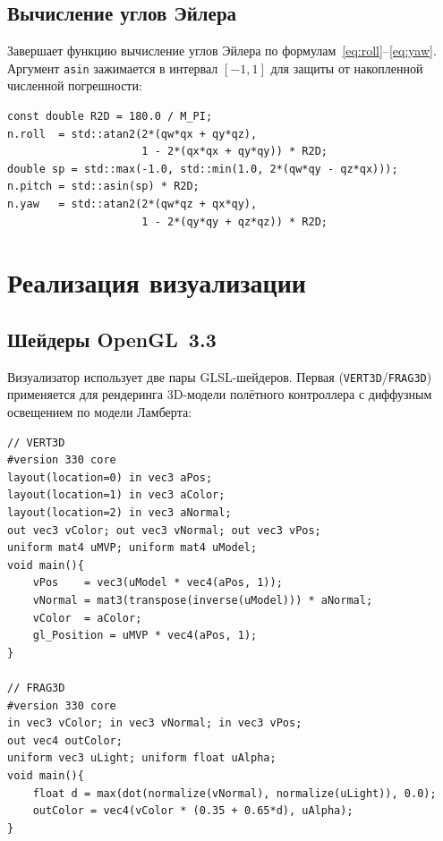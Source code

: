 \subsection{Вычисление углов Эйлера}
 
Завершает функцию вычисление углов Эйлера по
формулам~\eqref{eq:roll}--\eqref{eq:yaw}. Аргумент \texttt{asin}
зажимается в интервал $[-1,1]$ для защиты от накопленной численной
погрешности:
 
\begin{lstlisting}[caption={Углы Эйлера из кватерниона (ZYX)}]
const double R2D = 180.0 / M_PI;
n.roll  = std::atan2(2*(qw*qx + qy*qz),
                     1 - 2*(qx*qx + qy*qy)) * R2D;
double sp = std::max(-1.0, std::min(1.0, 2*(qw*qy - qz*qx)));
n.pitch = std::asin(sp) * R2D;
n.yaw   = std::atan2(2*(qw*qz + qx*qy),
                     1 - 2*(qy*qy + qz*qz)) * R2D;
\end{lstlisting}
 
\newpage
 
\section{Реализация визуализации}
 
\subsection{Шейдеры OpenGL~3.3}
 
Визуализатор использует две пары GLSL-шейдеров. Первая
(\texttt{VERT3D}/\texttt{FRAG3D}) применяется для рендеринга 3D-модели
полётного контроллера с диффузным освещением по модели Ламберта:
 
\begin{lstlisting}[language={},caption={Вершинный и фрагментный шейдеры 3D-модели}]
// VERT3D
#version 330 core
layout(location=0) in vec3 aPos;
layout(location=1) in vec3 aColor;
layout(location=2) in vec3 aNormal;
out vec3 vColor; out vec3 vNormal; out vec3 vPos;
uniform mat4 uMVP; uniform mat4 uModel;
void main(){
    vPos    = vec3(uModel * vec4(aPos, 1));
    vNormal = mat3(transpose(inverse(uModel))) * aNormal;
    vColor  = aColor;
    gl_Position = uMVP * vec4(aPos, 1);
}
 
// FRAG3D
#version 330 core
in vec3 vColor; in vec3 vNormal; in vec3 vPos;
out vec4 outColor;
uniform vec3 uLight; uniform float uAlpha;
void main(){
    float d = max(dot(normalize(vNormal), normalize(uLight)), 0.0);
    outColor = vec4(vColor * (0.35 + 0.65*d), uAlpha);
}
\end{lstlisting}
 

